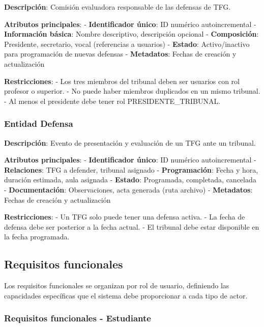\documentclass[12pt,a4paper,oneside]{report}
\begin{document}
\textbf{Descripción}: Comisión evaluadora responsable de las defensas de
TFG.

\textbf{Atributos principales}: - \textbf{Identificador único}: ID
numérico autoincremental - \textbf{Información básica}: Nombre
descriptivo, descripción opcional - \textbf{Composición}: Presidente,
secretario, vocal (referencias a usuarios) - \textbf{Estado}:
Activo/inactivo para programación de nuevas defensas -
\textbf{Metadatos}: Fechas de creación y actualización

\textbf{Restricciones}: - Los tres miembros del tribunal deben ser
usuarios con rol profesor o superior. - No puede haber miembros
duplicados en un mismo tribunal. - Al menos el presidente debe tener rol
PRESIDENTE\_TRIBUNAL.

\subsubsection{Entidad Defensa}\label{entidad-defensa}

\textbf{Descripción}: Evento de presentación y evaluación de un TFG ante
un tribunal.

\textbf{Atributos principales}: - \textbf{Identificador único}: ID
numérico autoincremental - \textbf{Relaciones}: TFG a defender, tribunal
asignado - \textbf{Programación}: Fecha y hora, duración estimada, aula
asignada - \textbf{Estado}: Programada, completada, cancelada -
\textbf{Documentación}: Observaciones, acta generada (ruta archivo) -
\textbf{Metadatos}: Fechas de creación y actualización

\textbf{Restricciones}: - Un TFG solo puede tener una defensa activa. -
La fecha de defensa debe ser posterior a la fecha actual. - El tribunal
debe estar disponible en la fecha programada.

\subsection{Requisitos funcionales}\label{requisitos-funcionales}

Los requisitos funcionales se organizan por rol de usuario, definiendo
las capacidades específicas que el sistema debe proporcionar a cada tipo
de actor.

\subsubsection{Requisitos funcionales -
Estudiante}\label{requisitos-funcionales---estudiante}
\end{document}
